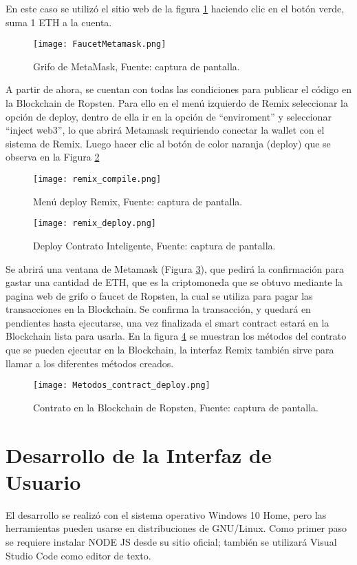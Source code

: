 En este caso se utilizó el sitio web de la figura \ref{img:faucet_metamask} haciendo clic en el  botón verde,
suma 1 ETH a la cuenta.
\begin{figure}[H]
  \centering
  {\texttt{[image: FaucetMetamask.png]}}
  \caption{Grifo de MetaMask, Fuente: captura de pantalla. }
  \label{img:faucet_metamask}
\end{figure}

A partir de ahora, se cuentan con todas las condiciones para publicar el código en la  Blockchain de Ropsten.
Para ello en el menú izquierdo de Remix  seleccionar la opción de  deploy, dentro de ella ir en la opción de “enviroment”  y seleccionar  “inject web3”, 
lo que abrirá Metamask requiriendo conectar la wallet con el sistema de Remix. Luego hacer clic al botón de color naranja (deploy) que se observa en la Figura \ref{img:remix_compile}

\begin{figure}[H]
  \centering
  {\texttt{[image: remix\_compile.png]}}
  \caption{Menú deploy Remix, Fuente: captura de pantalla. }
  \label{img:remix_compile}
\end{figure}

\begin{figure}[H]
  \centering
  {\texttt{[image: remix\_deploy.png]}}
  \caption{Deploy Contrato Inteligente, Fuente: captura de pantalla. }
  \label{img:remix_deploy}
\end{figure}

Se abrirá una ventana de Metamask (Figura \ref{img:remix_deploy}), que pedirá la confirmación para gastar una cantidad de ETH, que es la criptomoneda
que se obtuvo mediante  la pagina web de grifo o faucet de Ropsten, la cual se utiliza para pagar las transacciones en la Blockchain.
Se confirma la transacción, y quedará en pendientes hasta ejecutarse, una vez finalizada el smart contract estará en la  Blockchain lista para
usarla.
En la figura \ref{img:metodos_contract_deploy} se muestran los métodos del contrato que se pueden ejecutar en la Blockchain, la interfaz
Remix también sirve para llamar a los diferentes métodos creados.
\begin{figure}[hbt!]
  \centering
  {\texttt{[image: Metodos\_contract\_deploy.png]}}
  \caption{Contrato en la  Blockchain de Ropsten, Fuente: captura de pantalla. }
  \label{img:metodos_contract_deploy}
\end{figure}


\section{Desarrollo de la Interfaz de Usuario}
El desarrollo se realizó con el sistema operativo Windows 10 Home, pero
las herramientas pueden usarse en distribuciones de GNU/Linux.
Como primer paso se requiere instalar NODE JS desde su sitio oficial; también se utilizará Visual Studio Code como editor de texto.

